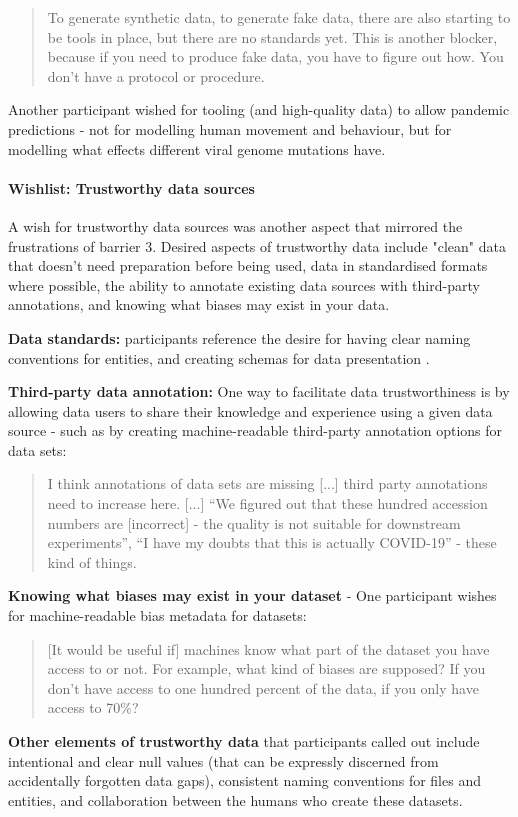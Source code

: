 \documentclass{CUP-JNL-DAP}%
\begin{document}
\blockquote{To generate synthetic data, to generate fake data, there are also starting to be tools in place, but there are no standards yet. This is another blocker, because if you need to produce fake data, you have to figure out how. You don't have a protocol or procedure.}

Another participant wished for tooling (and high-quality data) to allow pandemic predictions - not for modelling human movement and behaviour, but for modelling what effects different viral genome mutations have. 

\paragraph{Wishlist: Trustworthy data sources}

A wish for trustworthy data sources was another aspect that mirrored the frustrations of barrier 3. Desired aspects of trustworthy data include "clean" data that doesn't need preparation before being used, data in standardised formats where possible, the ability to annotate existing data sources with third-party annotations, and knowing what biases may exist in your data.

\textbf{Data standards:} participants reference the desire for having clear naming conventions for entities, and creating schemas for data presentation .

\textbf{Third-party data annotation:} One way to facilitate data trustworthiness is by allowing data users to share their knowledge and experience using a given data source - such as by creating machine-readable third-party annotation options for data sets: 

\blockquote{I think annotations of data sets are missing [...] third party annotations need to increase here. [...] \enquote{We figured out that these hundred accession numbers are [incorrect] - the quality is not suitable for downstream experiments}, \enquote{I have my doubts that this is actually COVID-19} - these kind of things.}

\textbf{Knowing what biases may exist in your dataset} - One participant wishes for machine-readable bias metadata for datasets: 

\blockquote{[It would be useful if] machines know what part of the dataset you have access to or not. For example, what kind of biases are supposed? If you don't have access to one hundred percent of the data, if you only have access to 70\%?}

\textbf{Other elements of trustworthy data} that participants called out include intentional and clear null values (that can be expressly discerned from accidentally forgotten data gaps), consistent naming conventions for files and entities, and collaboration between the humans who create these datasets.
\end{document}
